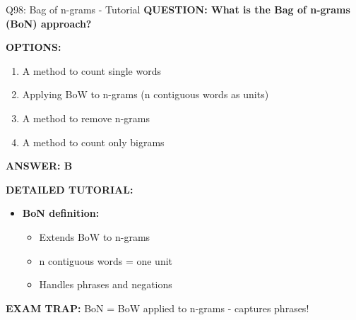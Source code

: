 \documentclass[8pt]{beamer}
\begin{document}
	\begin{frame}{Q98: Bag of n-grams - Tutorial}
		\fontsize{6.5}{7.5}\selectfont
		\textbf{QUESTION: What is the Bag of n-grams (BoN) approach?}
		
		\vspace{0.1cm}
		\textbf{OPTIONS:}
		\begin{enumerate}
			\item A method to count single words
			\item Applying BoW to n-grams (n contiguous words as units)
			\item A method to remove n-grams
			\item A method to count only bigrams
		\end{enumerate}
		
		\vspace{0.1cm}
		\textcolor{myblue}{\textbf{ANSWER: B}}
		
		\vspace{0.1cm}
		\textbf{DETAILED TUTORIAL:}
		\begin{itemize}
			\item \textbf{BoN definition:}
			\begin{itemize}
				\item Extends BoW to n-grams
				\item n contiguous words = one unit
				\item Handles phrases and negations
			\end{itemize}
		\end{itemize}
		
		\textcolor{myred}{\textbf{EXAM TRAP:}} BoN = \textcolor{myblue}{BoW applied to n-grams} - captures phrases!
	\end{frame}
	
\end{document}
